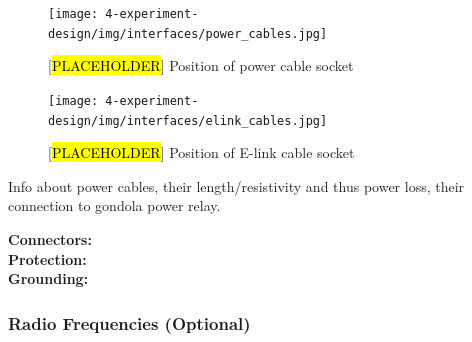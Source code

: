 \begin{figure}[H]
    \centering
	\texttt{[image: 4-experiment-design/img/interfaces/power\_cables.jpg]}
	\caption{[\hl{PLACEHOLDER}] Position of power cable socket}
\end{figure}

\begin{figure}[H]
    \centering
	\texttt{[image: 4-experiment-design/img/interfaces/elink\_cables.jpg]}
	\caption{[\hl{PLACEHOLDER}] Position of E-link cable socket}
\end{figure}

Info about power cables, their length/resistivity and thus power loss, their connection to gondola power relay. 



\textbf{Connectors:}\\

\textbf{Protection:}\\

\textbf{Grounding:}\\


\subsubsection{Radio Frequencies (Optional)}



\raggedbottom